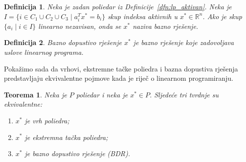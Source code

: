 \documentclass[b5paper, utf8, 11pt, colorlinks]{book}
\newtheorem{definition}{Definicija}[chapter]
\newtheorem{thm}{Teorema}[chapter]
\theoremstyle{definition}
\begin{document}
\begin{definition}
      Neka je zadan poliedar iz Definicije~\ref{dfn:lp_aktivan}. Neka je 
      $I = \{ i \in C_1 \cup C_2 \cup C_3 \mid a_i^T x^* = b_i \}$  skup indeksa aktivnih u $x^*\in \mathbb{R}^n$.  Ako je skup $\{ a_i \mid i \in I \}$ linearno nezavisan, onda se $x^*$  naziva bazno rješenje. 
\end{definition}
\begin{definition}
	 Bazno dopustivo rješenje $x^*$ je bazno rješenje koje zadovoljava  uslove linearnog programa. 
\end{definition}
Pokažimo sada da  vrhovi, ekstremne tačke poliedra i bazna dopustiva rješenja predstavljaju ekvivalentne pojmove kada je riječ o linearnom programiranju.

\begin{thm}
   Neka je $P$ poliedar i neka je $x^* \in P$. Sljedeće tri tvrdnje su ekvivalentne:
   \begin{enumerate}
       \item $x^*$ je vrh poliedra;
       \item $x^*$ je ekstremna tačka poliedra;
       \item $x^*$ je bazno dopustivo rješenje (BDR).
   \end{enumerate}
\end{thm}
\end{document}
